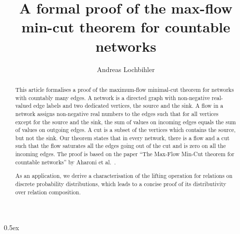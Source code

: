 \documentclass[11pt,a4paper]{article}
\begin{document}
\title{A formal proof of the max-flow min-cut theorem for countable networks}
\author{Andreas Lochbihler}
\maketitle

\begin{abstract}
  This article formalises a proof of the maximum-flow minimal-cut theorem for networks with 
  countably many edges.  A network is a directed graph with non-negative real-valued edge labels
  and two dedicated vertices, the source and the sink.  A flow in a network assigns non-negative
  real numbers to the edges such that for all vertices except for the source and the sink, the sum
  of values on incoming edges equals the sum of values on outgoing edges.  A cut is a subset of the
  vertices which contains the source, but not the sink.  Our theorem states that in every network,
  there is a flow and a cut such that the flow saturates all the edges going out of the cut and
  is zero on all the incoming edges.
  The proof is based on the paper ``The Max-Flow Min-Cut theorem for countable networks''
  by Aharoni et al.\ \cite{AharoniBergerGeorgakopoulusPerlsteinSpruessel2011JCT}.

  As an application, we derive a characterisation of the lifting operation for relations on
  discrete probability distributions, which leads to a concise proof of its distributivity over
  relation composition.
\end{abstract}

\tableofcontents

\parindent 0pt\parskip 0.5ex





\end{document}
